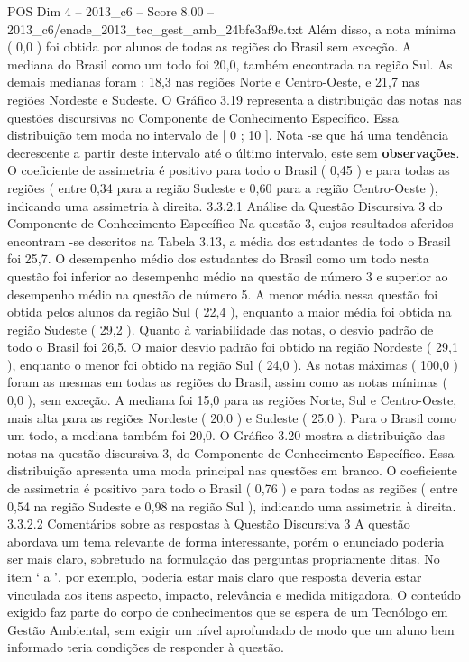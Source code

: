 \begin{textsample}{POS Dim 4 – 2013\_c6 – Score 8.00 – 2013\_c6/enade\_2013\_tec\_gest\_amb\_24bfe3af9c.txt}
Além disso, a nota mínima ( 0,0 ) foi obtida por alunos de todas as regiões do Brasil sem exceção.
A mediana do Brasil como um todo foi 20,0, também encontrada na região Sul.
As demais medianas foram : 18,3 nas regiões Norte e Centro-Oeste, e 21,7 nas regiões Nordeste e Sudeste.
O Gráfico 3.19 representa a distribuição das notas nas questões discursivas no Componente de Conhecimento Específico.
Essa distribuição tem moda no intervalo de [ 0 ; 10 ].
Nota -se que há uma tendência decrescente a partir deste intervalo até o último intervalo, este sem \textbf{observações}.
O coeficiente de assimetria é positivo para todo o Brasil ( 0,45 ) e para todas as regiões ( entre 0,34 para a região Sudeste e 0,60 para a região Centro-Oeste ), indicando uma assimetria à direita. 3.3.2.1 Análise da Questão Discursiva 3 do Componente de Conhecimento Específico Na questão 3, cujos resultados aferidos encontram -se descritos na Tabela 3.13, a média dos estudantes de todo o Brasil foi 25,7.
O desempenho médio dos estudantes do Brasil como um todo nesta questão foi inferior ao desempenho médio na questão de número 3 e superior ao desempenho médio na questão de número 5.
A menor média nessa questão foi obtida pelos alunos da região Sul ( 22,4 ), enquanto a maior média foi obtida na região Sudeste ( 29,2 ).
Quanto à variabilidade das notas, o desvio padrão de todo o Brasil foi 26,5.
O maior desvio padrão foi obtido na região Nordeste ( 29,1 ), enquanto o menor foi obtido na região Sul ( 24,0 ).
As notas máximas ( 100,0 ) foram as mesmas em todas as regiões do Brasil, assim como as notas mínimas ( 0,0 ), sem exceção.
A mediana foi 15,0 para as regiões Norte, Sul e Centro-Oeste, mais alta para as regiões Nordeste ( 20,0 ) e Sudeste ( 25,0 ).
Para o Brasil como um todo, a mediana também foi 20,0.
O Gráfico 3.20 mostra a distribuição das notas na questão discursiva 3, do Componente de Conhecimento Específico.
Essa distribuição apresenta uma moda principal nas questões em branco.
O coeficiente de assimetria é positivo para todo o Brasil ( 0,76 ) e para todas as regiões ( entre 0,54 na região Sudeste e 0,98 na região Sul ), indicando uma assimetria à direita. 3.3.2.2 Comentários sobre as respostas à Questão Discursiva 3 A questão abordava um tema relevante de forma interessante, porém o enunciado poderia ser mais claro, sobretudo na formulação das perguntas propriamente ditas.
No item ‘ a ’, por exemplo, poderia estar mais claro que resposta deveria estar vinculada aos itens aspecto, impacto, relevância e medida mitigadora.
O conteúdo exigido faz parte do corpo de conhecimentos que se espera de um Tecnólogo em Gestão Ambiental, sem exigir um nível aprofundado de modo que um aluno bem informado teria condições de responder à questão.

\end{textsample}
